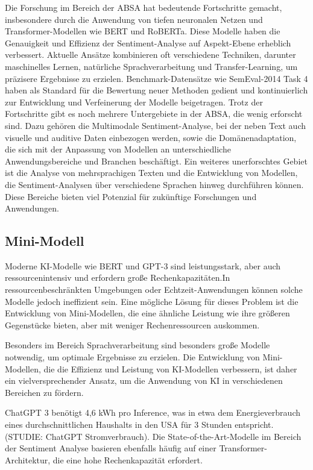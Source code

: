\documentclass[12pt]{article}
\begin{document}
Die Forschung im Bereich der ABSA hat bedeutende Fortschritte gemacht, insbesondere durch die Anwendung von tiefen neuronalen Netzen und 
Transformer-Modellen wie BERT und RoBERTa. Diese Modelle haben die Genauigkeit und Effizienz der Sentiment-Analyse auf Aspekt-Ebene erheblich 
verbessert. Aktuelle Ansätze kombinieren oft verschiedene Techniken, darunter maschinelles Lernen, natürliche Sprachverarbeitung und Transfer-Learning, 
um präzisere Ergebnisse zu erzielen. Benchmark-Datensätze wie SemEval-2014 Task 4 haben als Standard für die Bewertung neuer Methoden gedient und 
kontinuierlich zur Entwicklung und Verfeinerung der Modelle beigetragen.
\newline
\newline
Trotz der Fortschritte gibt es noch mehrere Untergebiete in der ABSA, die wenig erforscht sind. Dazu gehören die Multimodale Sentiment-Analyse, bei der 
neben Text auch visuelle und auditive Daten einbezogen werden, sowie die Domänenadaptation, die sich mit der Anpassung von Modellen an unterschiedliche 
Anwendungsbereiche und Branchen beschäftigt. Ein weiteres unerforschtes Gebiet ist die Analyse von mehrsprachigen Texten und die Entwicklung von 
Modellen, die Sentiment-Analysen über verschiedene Sprachen hinweg durchführen können. Diese Bereiche bieten viel Potenzial für zukünftige Forschungen 
und Anwendungen.

\subsection{Mini-Modell}

Moderne KI-Modelle wie BERT und GPT-3 sind leistungsstark, aber auch ressourcenintensiv und erfordern große Rechenkapazitäten.\newline In ressourcenbeschränkten 
Umgebungen oder Echtzeit-Anwendungen können solche Modelle jedoch ineffizient sein. Eine mögliche Lösung für dieses Problem ist die Entwicklung von 
Mini-Modellen, die eine ähnliche Leistung wie ihre größeren Gegenstücke bieten, aber mit weniger Rechenressourcen auskommen.

Besonders im Bereich Sprachverarbeitung sind besonders große Modelle notwendig, um optimale Ergebnisse zu erzielen. Die Entwicklung von Mini-Modellen, 
die die Effizienz und Leistung von KI-Modellen verbessern, ist daher ein vielversprechender Ansatz, um die Anwendung von KI in verschiedenen Bereichen 
zu fördern. 

ChatGPT 3 benötigt 4,6 kWh pro Inference, was in etwa dem Energieverbrauch eines durchschnittlichen Haushalts in den USA für 3 Stunden entspricht. 
(STUDIE: ChatGPT Stromverbrauch). Die State-of-the-Art-Modelle im Bereich der Sentiment Analyse basieren ebenfalls häufig auf einer Transformer-Architektur, 
die eine hohe Rechenkapazität erfordert.
\end{document}
